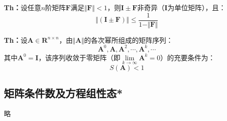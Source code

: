 \begin{enumerate}
    \textbf{Th：}设任意$n$阶矩阵$\boldsymbol{F}$满足$\Vert\boldsymbol{F}\Vert < 1$，则$\boldsymbol{I}\pm\boldsymbol{F}$非奇异（$\boldsymbol{I}$为单位矩阵），且：
    \begin{equation*}
        \Vert(\boldsymbol{I}\pm\boldsymbol{F})\Vert \leqslant \frac{1}{1-\Vert\boldsymbol{F}\Vert}
    \end{equation*}

    \textbf{Th：}设$\boldsymbol{A}\in\mathbf{R}^{n\times n}$，由$\Vert\boldsymbol{A}\Vert$的各次幂所组成的矩阵序列：
    \begin{equation*}
         \boldsymbol{A}^0,\boldsymbol{A},\boldsymbol{A}^2,\cdots,\boldsymbol{A}^k,\cdots
    \end{equation*}
    其中$\boldsymbol{A}^0 = \boldsymbol{I}$，该序列收敛于零矩阵（即$\lim\limits_{k\rightarrow\infty}\boldsymbol{A}^k = 0$）的充要条件为：
    \begin{equation*}
        S(\boldsymbol{A}) < 1
    \end{equation*}
\end{enumerate}

\subsection{矩阵条件数及方程组性态*}
略

% 